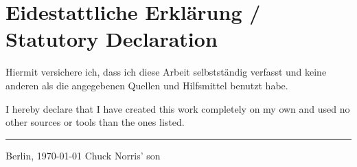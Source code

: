 \documentclass[twoside,11pt,titlepage,a4paper,english,bibliography=totocnumbered,listof=numbered]{scrbook}
\begin{document}
\cleardoublepage

\newpage

\section*{\thispagestyle{empty}Eidestattliche Erklärung / Statutory Declaration}
Hiermit versichere ich, dass ich diese Arbeit selbst\-ständig verfasst und keine anderen als die angegebenen Quellen und Hilfsmittel benutzt habe.
\vspace{2em}

\noindent I hereby declare that I have created this work completely on my own and used no other sources or tools than the ones listed.

\vspace{30 mm}
\begin{flushright}

\rule{90mm}{1pt}

Berlin, \today \hspace{15 mm} Chuck Norris' son
\end{flushright}
\clearpage

\cleardoublepage{}

\newpage



\thispagestyle{empty}

\tableofcontents{\thispagestyle{empty}}

\mainmatter








\backmatter

\listoftables
\listoffigures

\setwidesite{}						%

\label{cha:bibliography}
\printbibliography

\begin{appendices}



\end{appendices}
\end{document}
